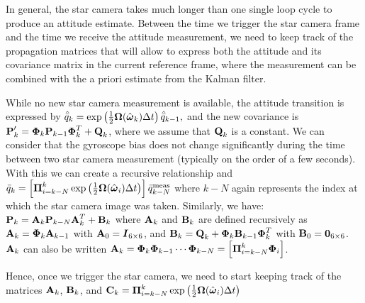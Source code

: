 In general, the star camera takes much longer than one single loop cycle to produce an attitude estimate. Between the time we trigger the star camera frame and the time we receive the attitude measurement, we need to keep track of the propagation matrices that will allow to express both the attitude and its covariance matrix in the current reference frame, where the measurement can be combined with the a priori estimate from the Kalman filter.

While no new star camera measurement is available, the attitude transition is expressed by $\hat{\bar{q}}_{k} = \exp\left(\frac{1}{2}\boldsymbol\Omega(\hat{\boldsymbol\omega}_{k})\Delta t\right)\hat{\bar{q}}_{k-1},$ and the new covariance is $\textrm{\textbf{P}}'_{k}  =  \boldsymbol{\Phi}_k \textrm{\textbf{P}}_{k-1}\boldsymbol{\Phi}^T_k + \textrm{\textbf{Q}}_k$, where we assume that $\textrm{\textbf{Q}}_k$ is a constant. We can consider that the gyroscope bias does not change significantly during the time between two star camera measurement (typically on the order of a few seconds). With this we can create a recursive relationship and $\bar{q}_{k} = \left[\boldsymbol\Pi_{i=k-N}^k\exp\left(\frac{1}{2}\boldsymbol\Omega(\hat{\boldsymbol\omega}_{i})\Delta t\right)\right]\bar{q}^{\textrm{meas}}_{k-N}$ where $k-N$ again represents the index at which the star camera image was taken. Similarly, we have: $\textrm{\textbf{P}}_{k} = \textrm{\textbf{A}}_k\textrm{\textbf{P}}_{k-N}\textrm{\textbf{A}}_k^T + \textrm{\textbf{B}}_k$ where $\textrm{\textbf{A}}_k$ and $\textrm{\textbf{B}}_k$ are defined recursively as $\textrm{\textbf{A}}_k = \boldsymbol{\Phi}_{k}\textrm{\textbf{A}}_{k-1}$ with $\textrm{\textbf{A}}_0 = \boldsymbol{I}_{6\times 6}$, and $\textrm{\textbf{B}}_k = \textrm{\textbf{Q}}_k + \boldsymbol{\Phi}_{k}\textrm{\textbf{B}}_{k-1}\boldsymbol{\Phi}_{k}^T$ with $\textrm{\textbf{B}}_0 = \boldsymbol{0}_{6\times 6}$. $\textrm{\textbf{A}}_k$ can also be written  $\textrm{\textbf{A}}_k = \boldsymbol{\Phi}_{k}\boldsymbol{\Phi}_{k-1}\cdots\boldsymbol{\Phi}_{k-N} = \left[\boldsymbol\Pi_{i=k-N}^k\boldsymbol{\Phi}_{i}\right]$.

Hence, once we trigger the star camera, we need to start keeping track of the matrices $\textrm{\textbf{A}}_k$, $\textrm{\textbf{B}}_k$, and $\textrm{\textbf{C}}_k = \boldsymbol\Pi_{i=k-N}^k\exp\left(\frac{1}{2}\boldsymbol\Omega(\hat{\boldsymbol\omega}_{i})\Delta t\right)$